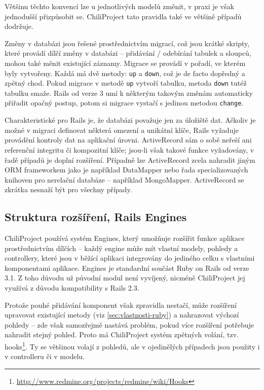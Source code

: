 \documentclass[thesis=B,czech]{FITthesis}[2012/05/02]
\begin{document}
Většinu těchto konvencí lze u jednotlivých modelů změnit, v praxi je
však jednodušší přizpůsobit se. ChiliProject tato pravidla také ve
většině případů dodržuje.

Změny v databázi jsou řešené prostřednictvím migrací, což jsou krátké
skripty, které provádí dílčí změny v databázi -- přidávání / odebírání
tabulek a sloupců, mohou také měnit existující záznamy. Migrace se
provádí v pořadí, ve kterém byly vytvořeny. Každá má dvě metody:
\lstinline!up! a \lstinline!down!, což je de facto dopředný a zpětný
chod. Pokud migrace v metodě \lstinline!up! vytvoří tabulku, metoda
\lstinline!down! tutéž tabulku smaže. Rails od verze 3 umí k některým
takovým změnám automaticky přiřadit opačný postup, potom si migrace
vystačí s jedinou metodou \lstinline!change!.

Charakteristické pro Rails je, že databázi považuje jen za 
úložiště dat. Ačkoliv je možné v migraci definovat některá omezení a unikátní klíče,
Rails vyžaduje provádění kontroly dat na aplikační úrovni.
ActiveRecord sám o sobě neřeší ani referenční integritu či
kompozitní klíče; jsou-li však takové funkce vyžadovány, v řadě případů
je doplní rozšíření. Případně lze ActiveRecord zcela nahradit jiným ORM
frameworkem jako je například DataMapper nebo řada specializovaných
knihoven pro nerelační databáze -- například MongoMapper. ActiveRecord
se zkrátka nesnaží být  pro všechny případy.

\subsection{Struktura rozšíření, Rails Engines}

ChiliProject používá systém Engines, který umožňuje rozšířit
funkce aplikace prostřednictvím dílčích  -- každý
engine může mít vlastní modely, pohledy a controllery, které jsou
v běžící aplikaci integrovány do jediného celku s vlastními komponentami
aplikace. Engines je standardní součást Ruby on Rails od verze 3.1.
Z toho důvodu už původní modul není vyvíjený, nicméně ChiliProject jej
využívá z důvodu kompatibility s Rails 2.3.

Protože pouhé přidávání komponent však zpravidla nestačí, může rozšíření
upravovat existující metody (viz
\ref{sec:vlastnosti-ruby}) a
nahrazovat výchozí pohledy -- zde však samozřejmě nastává problém, pokud
více rozšíření potřebuje nahradit stejný pohled. Proto má ChiliProject
systém zpětných volání, tzv. hooks\footnote{\url{http://www.redmine.org/projects/redmine/wiki/Hooks}}.
Ty se většinou volají z pohledů, ale v ojedinělých případech jsou
použity i v controlleru či v modelu.
\end{document}

